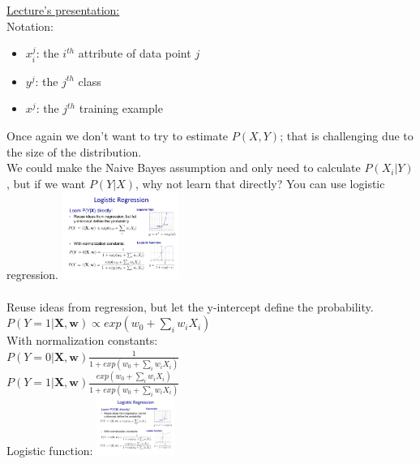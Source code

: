 \hfill \\ \hfill \\   

\underline{Lecture's presentation:} \hfill \\

Notation:  \hfill \\
\begin{itemize}
	\item $x_i^j$: the $i^{th}$ attribute of data point $j$
	\item $y^j$: the $j^{th}$ class  %
	\item $x^j$: the $j^{th}$ training example
\end{itemize}

Once again we don't want to try to estimate $P(X,Y)$; that is challenging due to the size of the distribution. \hfill \\
We could make the Naive Bayes assumption and only need to calculate $P(X_i | Y)$, 
but if we want $P(Y|X)$, why not learn that directly?  You can use logistic regression. 
\includegraphics[width=1.5in]{figures/expo.pdf}     \hfill \\
\hfill \\

Reuse ideas from regression, but let the y-intercept define the probability.  \hfill \\
$P(Y=1|\bm{X, w}) \propto exp(w_0 + \sum_i w_i X_i)$  \hfill \\
With normalization constants:  \hfill \\
$\displaystyle  P(Y=0|\bm{X, w}) \frac{1}{1+ exp(w_0 + \sum_i w_i X_i)} $ \hfill \\
$\displaystyle  P(Y=1|\bm{X, w}) \frac{exp(w_0 + \sum_i w_i X_i)}{1+ exp(w_0 + \sum_i w_i X_i)} $ \hfill \\
Logistic function: \includegraphics[width=1in]{figures/logistic.pdf}     \hfill \\
 \hfill \\
 
